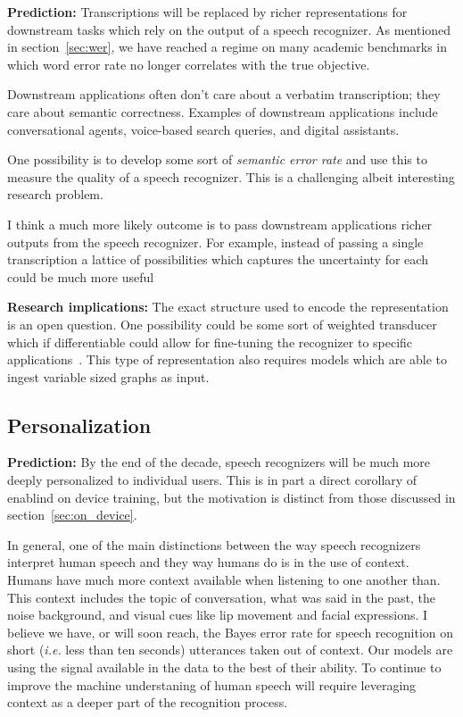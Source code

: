 {\bf Prediction:} Transcriptions will be replaced by richer representations for
downstream tasks which rely on the output of a speech recognizer. As mentioned
in section~\ref{sec:wer}, we have reached a regime on many academic benchmarks
in which word error rate no longer correlates with the true objective.

Downstream applications often don't care about a verbatim transcription; they
care about semantic correctness. Examples of downstream applications include
conversational agents, voice-based search queries, and digital assistants.

One possibility is to develop some sort of \emph{semantic error rate} and use
this to measure the quality of a speech recognizer. This is a challenging
albeit interesting research problem.

I think a much more likely outcome is to pass downstream applications richer
outputs from the speech recognizer. For example, instead of passing a single
transcription a lattice of possibilities which captures the uncertainty for
each could be much more useful

{\bf Research implications:} The exact structure used to encode the
representation is an open question. One possibility could be some sort of
weighted transducer which if differentiable could allow for fine-tuning the
recognizer to specific applications~\cite{hannun2020differentiable, k2}. This
type of representation also requires models which are able to ingest variable
sized graphs as input.

\subsection{Personalization}

{\bf Prediction:} By the end of the decade, speech recognizers will be much
more deeply personalized to individual users. This is in part a direct
corollary of enablind on device training, but the motivation is distinct from
those discussed in section~\ref{sec:on_device}.

In general, one of the main distinctions between the way speech recognizers
interpret human speech and they way humans do is in the use of context. Humans
have much more context available when listening to one another than. This
context includes the topic of conversation, what was said in the past, the
noise background, and visual cues like lip movement and facial expressions. I
believe we have, or will soon reach, the Bayes error rate for speech
recognition on short (\emph{i.e.} less than ten seconds) utterances taken out
of context. Our models are using the signal available in the data to the best
of their ability. To continue to improve the machine understaning of human
speech will require leveraging context as a deeper part of the recognition
process.

